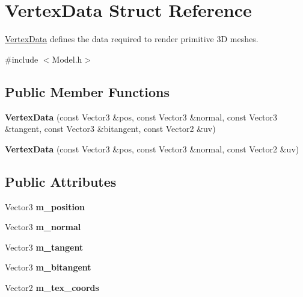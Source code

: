 \hypertarget{structVertexData}{}\section{Vertex\+Data Struct Reference}
\label{structVertexData}


\hyperlink{structVertexData}{Vertex\+Data} defines the data required to render primitive 3D meshes.  




{\ttfamily \#include $<$Model.\+h$>$}

\subsection*{Public Member Functions}
\begin{DoxyCompactItemize}
\item 
\mbox{\label{structVertexData_abf3e41eb31cd7fdf38007d5b48d01ceb}} 
{\bfseries Vertex\+Data} (const Vector3 \&pos, const Vector3 \&normal, const Vector3 \&tangent, const Vector3 \&bitangent, const Vector2 \&uv)
\item 
\mbox{\label{structVertexData_a68e6e2d81fba7f341e07cf745ed52a1c}} 
{\bfseries Vertex\+Data} (const Vector3 \&pos, const Vector3 \&normal, const Vector2 \&uv)
\end{DoxyCompactItemize}
\subsection*{Public Attributes}
\begin{DoxyCompactItemize}
\item 
\mbox{\label{structVertexData_a1a663ce58f40113256072fcf56eb9275}} 
Vector3 {\bfseries m\+\_\+position}
\item 
\mbox{\label{structVertexData_ab02659723f5bbcede17e149b350e1017}} 
Vector3 {\bfseries m\+\_\+normal}
\item 
\mbox{\label{structVertexData_a4b4e81dd8575c585ffedd5d1ab101e8f}} 
Vector3 {\bfseries m\+\_\+tangent}
\item 
\mbox{\label{structVertexData_a33c0e5127a8ef25613588f66e8dce5fb}} 
Vector3 {\bfseries m\+\_\+bitangent}
\item 
\mbox{\label{structVertexData_ac25d55e9fffa733f8c11363ec17520ee}} 
Vector2 {\bfseries m\+\_\+tex\+\_\+coords}
\end{DoxyCompactItemize}


